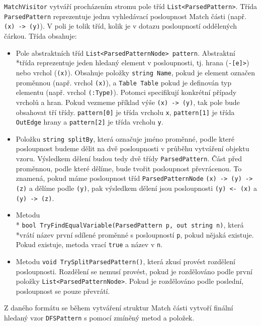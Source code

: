\texttt{MatchVisitor} vytváří procházením stromu pole tříd \texttt{List<ParsedPattern>}.
Třída \texttt{ParsedPattern} reprezentuje jednu vyhledávací posloupnost Match části (např. \texttt{(x) -> (y)}).
V poli je tolik tříd, kolik je v dotazu posloupností oddělených čárkou.
Třída obsahuje:
\begin{itemize}
\item Pole abstraktních tříd \texttt{List<ParsedPatternNode> pattern}.
Abstraktní \\*třída reprezentuje jeden hledaný element v posloupnosti, tj. hrana  (\texttt{-[e]>}) nebo vrchol (\texttt{(x)}).
Obsahuje položky \texttt{string Name}, pokud je element označen proměnnou (např. vrchol \texttt{(x)}), a \texttt{Table Table} pokud je definován typ elementu (např. vrchol \texttt{(:Type)}).
Potomci specifikují konkrétní případy vrcholů a hran. Pokud vezmeme příklad výše \texttt{(x) -> (y)}, tak pole bude obsahovat tří třídy.
\texttt{pattern[0]} je třída vrcholu \texttt{x}, \texttt{pattern[1]} je třída \texttt{OutEdge} hrany a \texttt{pattern[2]} je třída vrcholu \texttt{y}.

\item Položku \texttt{string splitBy}, která označuje jméno proměnné, podle které posloupnost budeme dělit na dvě posloupnosti v průběhu vytváření objektu vzoru.
Výsledkem dělení budou tedy dvě třídy \texttt{ParsedPattern}.
Část před proměnnou, podle které dělíme, bude tvořit posloupnost převrácenou.
To znamená, pokud máme posloupnost tříd \texttt{ParsedPatternNode} \texttt{(x) -> (y) -> (z)} a dělíme podle \texttt{(y)}, pak výsledkem dělení jsou posloupnosti 
\texttt{(y) <- (x)} a \texttt{(y) -> (z)}.

\item Metodu\\* \texttt{bool TryFindEqualVariable(ParsedPattern p, out string n)}, která \\*vrátí název první sdílené proměnné s posloupností \texttt{p}, pokud nějaká existuje.
Pokud existuje, metoda vrací \texttt{true} a název v \texttt{n}.

\item Metodu \texttt{void TrySplitParsedPattern()}, která zkusí provést rozdělení posloupnosti.
Rozdělení se nemusí provést, pokud je rozdělováno podle první položky \texttt{List<ParsedPatternNode>}. 
Pokud je rozdělováno podle poslední, posloupnost se pouze převrátí.

\end{itemize}
Z daného formátu se během vytváření struktur Match části vytvoří finální hledaný vzor \texttt{DFSPattern} s pomocí zmíněný metod a položek.

